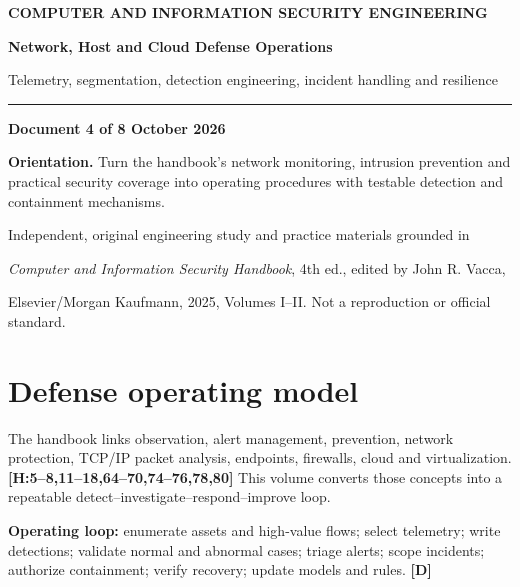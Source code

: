 \documentclass[10pt,letterpaper,oneside]{article}
\newcommand{\handbookref}[1]{\textsf{\color{accent}\textbf{[H:#1]}}}
\newcommand{\designed}{\textsf{\color{accent}\textbf{[D]}}}
\newcommand{\makereportcover}[4]{%
\hypersetup{pageanchor=false}%

\thispagestyle{empty}\vspace*{1.15in}
{\small\bfseries\color{accent} COMPUTER AND INFORMATION SECURITY ENGINEERING}\par\vspace{13pt}
{\Huge\bfseries\color{ink} #1\par}\vspace{15pt}
{\Large\color{muted} #2\par}\vspace{18pt}
\color{accent}\rule{0.94\textwidth}{2.1pt}\par\vspace{20pt}
{\normalsize\bfseries Document #3 of 8 \quad\textbullet\quad 16 October 2026\par}
\vspace{0.35in}
\begin{sourcebox}\textbf{Orientation.} #4\end{sourcebox}
\vfill
{\small\color{muted} Independent, original engineering study and practice materials grounded in\par
\emph{Computer and Information Security Handbook}, 4th ed., edited by John R. Vacca,\par
Elsevier/Morgan Kaufmann, 2025, Volumes I--II. Not a reproduction or official standard.}
\newpage\hypersetup{pageanchor=true}\setcounter{page}{1}\tableofcontents\newpage
}
\begin{document}
\makereportcover{Network, Host and Cloud Defense Operations}{Telemetry, segmentation, detection engineering, incident handling and resilience}{4}{Turn the handbook's network monitoring, intrusion prevention and practical security coverage into operating procedures with testable detection and containment mechanisms.}

\section{Defense operating model}
The handbook links observation, alert management, prevention, network protection, TCP/IP packet analysis, endpoints, firewalls, cloud and virtualization. \handbookref{5--8,11--18,64--70,74--76,78,80} This volume converts those concepts into a repeatable detect--investigate--respond--improve loop.
\begin{sourcebox}\textbf{Operating loop:} enumerate assets and high-value flows; select telemetry; write detections; validate normal and abnormal cases; triage alerts; scope incidents; authorize containment; verify recovery; update models and rules. \designed{}\end{sourcebox}
\end{document}
